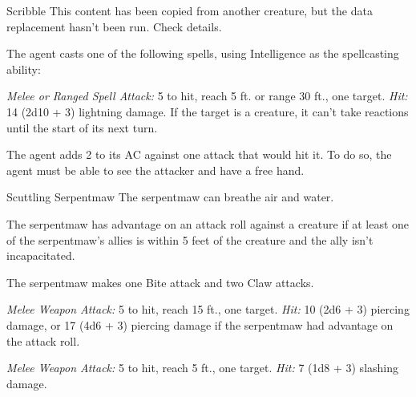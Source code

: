 \documentclass[10pt,a4paper,twoside,bg=print,twocolumn,openany,nodeprecatedcode]{dndbook}
\begin{document}
\begin{DndMonster}[float=t]{Scribble}
\DndMonsterBasics[
armor-class = {11},
hit-points = {\DndDice{4d8 + 4}},
speed = {30 ft.}
]
\DndMonsterAbilityScores[
 str = 10,
 dex = 12,
 con = 12,
 int = 16,
 wis = 12,
 cha = 10
]
\DndMonsterDetails[
saving-throws = {Int +5},
skills = {Arcana +5, History +5, Investigation +5},
languages = {Common plus one other language},
challenge = 1,
]
This content has been copied from another creature, but the data replacement hasn't been run. Check details.

The agent casts one of the following spells, using Intelligence as the spellcasting ability:
\begin{DndMonsterSpells}
\end{DndMonsterSpells}
\textsl{Melee or Ranged Spell Attack:} 5 to hit, reach 5 ft. or range 30 ft., one target. \textsl{Hit:} 14 (2d10 + 3) lightning damage. If the target is a creature, it can't take reactions until the start of its next turn.

The agent adds 2 to its AC against one attack that would hit it. To do so, the agent must be able to see the attacker and have a free hand.

\end{DndMonster}


\clearpage

\begin{DndMonster}[float=t]{Scuttling Serpentmaw}
\DndMonsterBasics[
armor-class = {17 (natural armor)},
hit-points = {\DndDice{10d6 + 30}},
speed = {30 ft.}
]
\DndMonsterAbilityScores[
 str = 16,
 dex = 14,
 con = 16,
 int = 3,
 wis = 11,
 cha = 3
]
\DndMonsterDetails[
skills = {Stealth +6},
senses = {blindsight 60 ft. (blind beyond this radius), passive perception 10},
challenge = 4,
]
The serpentmaw can breathe air and water.

The serpentmaw has advantage on an attack roll against a creature if at least one of the serpentmaw's allies is within 5 feet of the creature and the ally isn't incapacitated.

The serpentmaw makes one Bite attack and two Claw attacks.

\textsl{Melee Weapon Attack:} 5 to hit, reach 15 ft., one target. \textsl{Hit:} 10 (2d6 + 3) piercing damage, or 17 (4d6 + 3) piercing damage if the serpentmaw had advantage on the attack roll.

\textsl{Melee Weapon Attack:} 5 to hit, reach 5 ft., one target. \textsl{Hit:} 7 (1d8 + 3) slashing damage.

\end{DndMonster}
\end{document}
